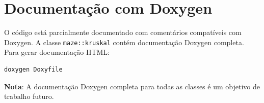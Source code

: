 \section{Documentação com Doxygen} \label{sec:impl_doxygen}
O código está parcialmente documentado com comentários compatíveis com Doxygen. A classe \texttt{maze::kruskal} contém documentação Doxygen completa. Para gerar documentação HTML:

\begin{lstlisting}[language=bash]
doxygen Doxyfile
\end{lstlisting}

\textbf{Nota}: A documentação Doxygen completa para todas as classes é um objetivo de trabalho futuro.
